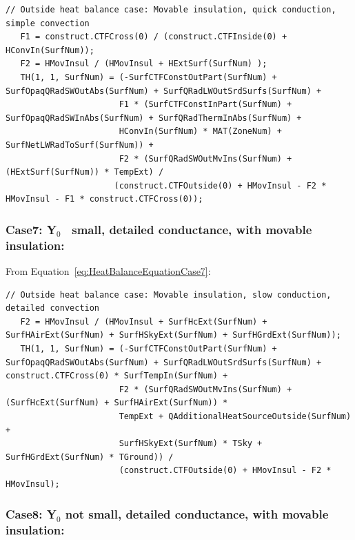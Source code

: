 \begin{lstlisting}
// Outside heat balance case: Movable insulation, quick conduction, simple convection
   F1 = construct.CTFCross(0) / (construct.CTFInside(0) + HConvIn(SurfNum));
   F2 = HMovInsul / (HMovInsul + HExtSurf(SurfNum) );
   TH(1, 1, SurfNum) = (-SurfCTFConstOutPart(SurfNum) + SurfOpaqQRadSWOutAbs(SurfNum) + SurfQRadLWOutSrdSurfs(SurfNum) +
                       F1 * (SurfCTFConstInPart(SurfNum) + SurfOpaqQRadSWInAbs(SurfNum) + SurfQRadThermInAbs(SurfNum) +
                       HConvIn(SurfNum) * MAT(ZoneNum) + SurfNetLWRadToSurf(SurfNum)) +
                       F2 * (SurfQRadSWOutMvIns(SurfNum) + (HExtSurf(SurfNum)) * TempExt) /
                      (construct.CTFOutside(0) + HMovInsul - F2 * HMovInsul - F1 * construct.CTFCross(0));
\end{lstlisting}

\subsubsection{Case7: Y\(_{0}\)~ small, detailed conductance, with movable insulation:}\label{case7-yux5f0-small-detailed-conductance-with-movable-insulation-1}

From Equation~\ref{eq:HeatBalanceEquationCase7}:

\begin{lstlisting}
// Outside heat balance case: Movable insulation, slow conduction, detailed convection
   F2 = HMovInsul / (HMovInsul + SurfHcExt(SurfNum) + SurfHAirExt(SurfNum) + SurfHSkyExt(SurfNum) + SurfHGrdExt(SurfNum));
   TH(1, 1, SurfNum) = (-SurfCTFConstOutPart(SurfNum) + SurfOpaqQRadSWOutAbs(SurfNum) + SurfQRadLWOutSrdSurfs(SurfNum) + construct.CTFCross(0) * SurfTempIn(SurfNum) +
                       F2 * (SurfQRadSWOutMvIns(SurfNum) + (SurfHcExt(SurfNum) + SurfHAirExt(SurfNum)) *
                       TempExt + QAdditionalHeatSourceOutside(SurfNum) +
                       SurfHSkyExt(SurfNum) * TSky + SurfHGrdExt(SurfNum) * TGround)) /
                       (construct.CTFOutside(0) + HMovInsul - F2 * HMovInsul);
\end{lstlisting}

\subsubsection{Case8: Y\(_{0}\) not small, detailed conductance, with movable insulation:}\label{case8-yux5f0-not-small-detailed-conductance-with-movable-insulation-1}

